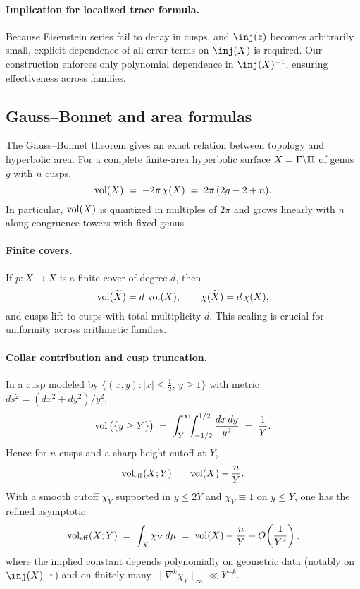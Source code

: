 \paragraph{Implication for localized trace formula.}
Because Eisenstein series fail to decay in cusps, and $\inj(z)$ becomes arbitrarily small, explicit dependence of all error terms on $\inj(X)$ is required. Our construction enforces only polynomial dependence in $\inj(X)^{-1}$, ensuring effectiveness across families.

\subsection{Gauss--Bonnet and area formulas}\label{subsec:gaussbonnet}

The Gauss--Bonnet theorem gives an exact relation between topology and hyperbolic area.  
For a complete finite-area hyperbolic surface $X=\Gamma\backslash\mathbb{H}$ of genus $g$ with $n$ cusps,
\begin{equation}\label{eq:GB}
  \operatorname{vol}(X) \;=\; -2\pi\,\chi(X) \;=\; 2\pi\,(2g-2+n).
\end{equation}
In particular, $\operatorname{vol}(X)$ is quantized in multiples of $2\pi$ and grows linearly with $n$ along congruence towers with fixed genus.

\paragraph{Finite covers.}
If $p:\widetilde X\to X$ is a finite cover of degree $d$, then
\[
  \operatorname{vol}(\widetilde X) = d\,\operatorname{vol}(X), \qquad \chi(\widetilde X) = d\,\chi(X),
\]
and cusps lift to cusps with total multiplicity $d$. This scaling is crucial for uniformity across arithmetic families.

\paragraph{Collar contribution and cusp truncation.}
In a cusp modeled by $\{(x,y): |x|\le \tfrac12,\, y\ge 1\}$ with metric $ds^2=(dx^2+dy^2)/y^2$,
\[
  \operatorname{vol}\big(\{y\ge Y\}\big) \;=\; \int_Y^\infty\!\!\int_{-1/2}^{1/2} \frac{dx\,dy}{y^2} \;=\; \frac{1}{Y}.
\]
Hence for $n$ cusps and a sharp height cutoff at $Y$,
\begin{equation}\label{eq:veff-sharp}
  \operatorname{vol}_{\mathrm{eff}}(X;Y) \;=\; \operatorname{vol}(X) - \frac{n}{Y}.
\end{equation}
With a smooth cutoff $\chi_Y$ supported in $y\le 2Y$ and $\chi_Y\equiv 1$ on $y\le Y$, one has the refined asymptotic
\begin{equation}\label{eq:veff-smooth}
  \operatorname{vol}_{\mathrm{eff}}(X;Y) \;=\; \int_X \chi_Y\,d\mu \;=\; \operatorname{vol}(X) - \frac{n}{Y} + O\!\left(\frac{1}{Y^2}\right),
\end{equation}
where the implied constant depends polynomially on geometric data (notably on $\inj(X)^{-1}$) and on finitely many $\|\nabla^k\chi_Y\|_\infty \ll Y^{-k}$.

